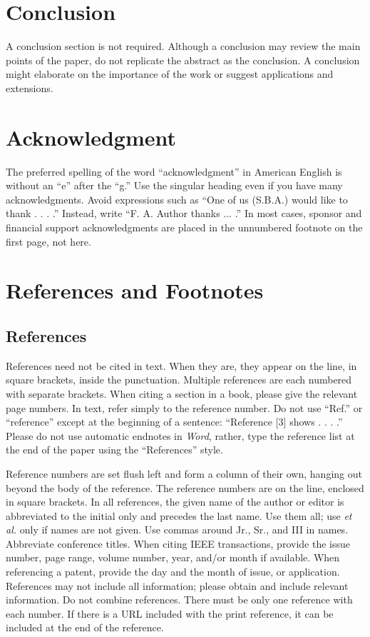 \documentclass[journal]{IEEEtran}
\begin{document}
\section{Conclusion}

A conclusion section is not required. Although a conclusion may review the main points of the paper, do not replicate the abstract as the conclusion. A conclusion might elaborate on the importance of the work or suggest applications and extensions. 

\section{Acknowledgment}

The preferred spelling of the word ``acknowledgment'' in American English is without an ``e'' after the ``g.'' Use the singular heading even if you have many acknowledgments. Avoid expressions such as ``One of us (S.B.A.) would like to thank . . . .'' Instead, write “F. A. Author thanks ... .” In most cases, sponsor and financial support acknowledgments are placed in the unnumbered footnote on the first page, not here.

\section{References and Footnotes}

\subsection{References}

References need not be cited in text. When they are, they appear on the line, in square brackets, inside the punctuation.  Multiple references are each numbered with separate brackets. When citing a section in a book, please give the relevant page numbers. In text, refer simply to the reference number. Do not use ``Ref.'' or ``reference'' except at the beginning of a sentence: ``Reference [3] shows . . . .'' Please do not use automatic endnotes in {\em Word}, rather, type the reference list at the end of the paper using the ``References'' style.

Reference numbers are set flush left and form a column of their own, hanging out beyond the body of the reference. The reference numbers are on the line, enclosed in square brackets. In all references, the given name of the author or editor is abbreviated to the initial only and precedes the last name. Use them all; use {\em et al.} only if names are not given. Use commas around Jr., Sr., and III in names. Abbreviate conference titles.  When citing IEEE transactions, provide the issue number, page range, volume number, year, and/or month if available. When referencing a patent, provide the day and the month of issue, or application. References may not include all information; please obtain and include relevant information. Do not combine references. There must be only one reference with each number. If there is a URL included with the print reference, it can be included at the end of the reference.
\end{document}

